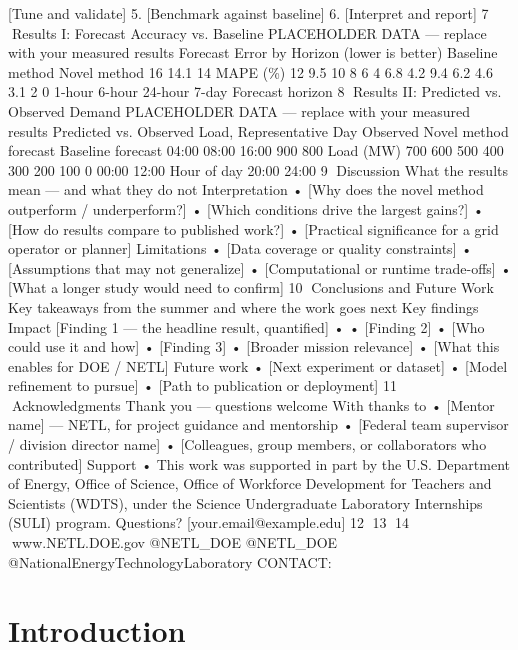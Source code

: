 \documentclass[12pt]{article} %
\begin{document}
[Tune and validate] 5. [Benchmark against baseline] 6. [Interpret and report] 7 Results I: Forecast Accuracy vs. Baseline PLACEHOLDER DATA — replace with your measured results Forecast Error by Horizon (lower is better) Baseline method Novel method 16 14.1 14 MAPE (\%) 12 9.5 10 8 6 4 6.8 4.2 9.4 6.2 4.6 3.1 2 0 1-hour 6-hour 24-hour 7-day Forecast horizon 8 Results II: Predicted vs. Observed Demand PLACEHOLDER DATA — replace with your measured results Predicted vs. Observed Load, Representative Day Observed Novel method forecast Baseline forecast 04:00 08:00 16:00 900 800 Load (MW) 700 600 500 400 300 200 100 0 00:00 12:00 Hour of day 20:00 24:00 9 Discussion What the results mean — and what they do not Interpretation • [Why does the novel method outperform / underperform?] • [Which conditions drive the largest gains?] • [How do results compare to published work?] • [Practical significance for a grid operator or planner] Limitations • [Data coverage or quality constraints] • [Assumptions that may not generalize] • [Computational or runtime trade-offs] • [What a longer study would need to confirm] 10 Conclusions and Future Work Key takeaways from the summer and where the work goes next Key findings Impact [Finding 1 — the headline result, quantified] • • [Finding 2] • [Who could use it and how] • [Finding 3] • [Broader mission relevance] • [What this enables for DOE / NETL] Future work • [Next experiment or dataset] • [Model refinement to pursue] • [Path to publication or deployment] 11 Acknowledgments Thank you — questions welcome With thanks to • [Mentor name] — NETL, for project guidance and mentorship • [Federal team supervisor / division director name] • [Colleagues, group members, or collaborators who contributed] Support • This work was supported in part by the U.S. Department of Energy, Office of Science, Office of Workforce Development for Teachers and Scientists (WDTS), under the Science Undergraduate Laboratory Internships (SULI) program. Questions? [your.email@example.edu] 12 13 14 www.NETL.DOE.gov @NETL\_DOE @NETL\_DOE @NationalEnergyTechnologyLaboratory CONTACT:
\normalsize

\vspace{1em}


\section{Introduction}
\end{document}
